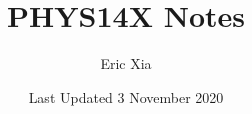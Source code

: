\documentclass{article}
\title{PHYS14X Notes}
\author{Eric Xia}
\date{Last Updated 3 November 2020}
\begin{document}
    \maketitle
    \tableofcontents
    \pagebreak



    
    
    
    
    
    
    
    
    
    
    
    
    
\end{document}
